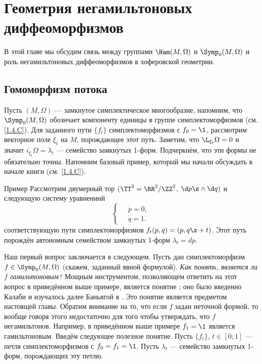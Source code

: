 \chapter[Негамильтоновы диффеоморфизмы]{Геометрия негамильтоновых диффеоморфизмов}\label{chap:14}

В этой главе мы обсудим связь между группами $\Ham(M,\Omega)$ и $\Symp_0(M,\Omega)$ и роль негамильтоновых диффеоморфизмов в хоферовской геометрии.

\section{Гомоморфизм потока}\label{sec:14.1}

Пусть $(M,\Omega)$ --- замкнутое симплектическое многообразие,
напомним, что $\Symp_0(M,\Omega)$ обознчает компоненту единицы в
группе симплектоморфизмов (см. \ref{1.4.C}).
Для заданного пути $\{f_t\}$ симплектоморфизмов с $f_0 = \1$,
рассмотрим векторное поле $\xi_t$ на $M$, порождающее этот путь.
Заметим, что $\L_{\xi_t}\Omega=0$ и значит
$i_{\xi_t}\Omega=\lambda_t$ --- семейство замкнутых 1-форм.
Подчеркнём, что эти формы не обязательно точны.
Напомним базовый пример, который мы начали обсуждать в начале книги
(см. \ref{1.4.C}). 


\begin{thm}{Пример}\label{14.1.A}
Рассмотрим двумерный тор $(\TT^2=\RR^2/\ZZ^2$, $\d p\z\wedge \d q)$ и
следующую систему уравненинй 
\[
\begin{cases}
\quad\dot p=0,
\\
\quad\dot q=1.
\end{cases}
\]
соответствующую пути симплектоморфизмов $f_t(p, q) = (p, q \z+ t)$.
Этот путь порождён автономным семейством замкнутых 1-форм $\lambda_t = dp$.
\end{thm}


Наш первый вопрос заключается в следующем.
Пусть дан симплектоморфизм $f\in\Symp_0(M,\Omega)$ (скажем, заданный
явной формулой).
\textit{Как понять, является ли $f$ гамильтоновым?}
Мощным инструментом, позволяющем ответить на этот вопрос в приведённом
выше примере, является понятие ; оно было
введенно Калаби и изучалось далее
Баньягой в \cite{B1}.
Это понятие является предметом настоящей главы.
Обратим внимание на то, что если $f$ задан неточной формой, то вообще
говоря этого недостаточно для того чтобы утверждать, что $f$
негамильтонов.
Например, в приведённом выше примере $f_1 = \1$ является гамильтоновым.
Введём следующее полезное понятие.
Пусть $\{f_t\}$, $t\in[0;1]$ --- петля симплектоморфизмов с $f_0 = f_1 = \1$.
Пусть ${\lambda_t}$ --- семейство замкнутых 1-форм, порождающих эту петлю.


